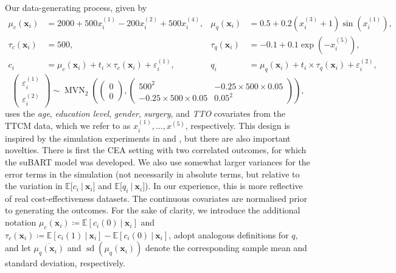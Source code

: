 \documentclass[aoas,preprint]{imsart}
\newcommand\given[1][]{\:#1\vert\:}
\theoremstyle{plain}
\theoremstyle{definition}
\theoremstyle{remark}
\begin{document}
Our data-generating process, given by 
\begin{align*}
\mu_c(\mathbf{x}_i) &= 2000 + 500x^{(1)}_i -200x^{(2)}_i + 500x^{(4)}_i,&\mu_q(\mathbf{x}_i) &= 0.5 + 0.2(x^{(3)}_i + 1)\sin(x^{(1)}_i), \\
\tau_c(\mathbf{x}_i) &= 500,&\tau_q(\mathbf{x}_i) &= -0.1 + 0.1\exp(-x^{(5)}_i), \\
c_i &= \mu_c(\mathbf{x}_i) + t_i \times \tau_c(\mathbf{x}_i) + \varepsilon^{(1)}_i,  
&q_i &= \mu_q(\mathbf{x}_i) + t_i \times \tau_q(\mathbf{x}_i) + \varepsilon^{(2)}_i,
\end{align*}
\[\begin{pmatrix}  \varepsilon_i^{(1)} \\ \varepsilon_i^{(2)} \end{pmatrix} \sim \operatorname{MVN}_2 \left( \begin{pmatrix}  0 \\ 0 \end{pmatrix} , \begin{pmatrix}  500^2 & -0.25 \times 500 \times 0.05 \\ -0.25 \times 500 \times 0.05 & 0.05^2 \end{pmatrix}\right),\]
uses the \textit{age}, \textit{education level}, \textit{gender}, \textit{surgery}, and \textit{TTO} covariates from the TTCM data, which we refer to as $x^{(1)}_i, \dots, x^{(5)}$, respectively. This design is inspired by the simulation experiments in \citet{hill2011bayesian} and \citet{hahn2020bayesian}, but there are also important novelties. There is first the CEA setting with two correlated outcomes, for which the suBART model was developed. We also use somewhat larger variances for the error terms in the simulation (not necessarily in absolute terms, but relative to the variation in $\mathbb{E}\lbrack c_i\given \mathbf{x}_i\rbrack$ and  $\mathbb{E}\lbrack q_i\given \mathbf{x}_i\rbrack$). In our experience, this is more reflective of real cost-effectiveness datasets. 
The continuous covariates are normalised prior to generating the outcomes. For the sake of clarity, we introduce the additional notation $\mu_c(\mathbf{x}_i) \coloneqq \mathbb{E}\left\lbrack c_i(0)\given \mathbf{x}_i\right\rbrack$ and $\tau_c(\mathbf{x}_i) \coloneqq \mathbb{E}\left\lbrack c_i(1)\given \mathbf{x}_i\right\rbrack - \mathbb{E}\left\lbrack c_i(0)\given \mathbf{x}_i\right\rbrack$, adopt analogous definitions for $q$, and let $\overline{\mu_q(\mathbf{x}_i)}$ and $\operatorname{sd}(\mu_q(\mathbf{x}_i))$ denote the corresponding sample mean and standard deviation, respectively.
\end{document}
